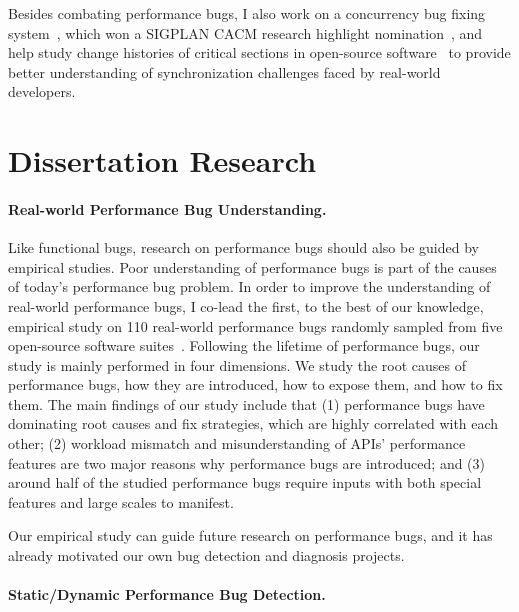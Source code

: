 \documentclass[10pt]{article}
\begin{document}
Besides combating performance bugs, 
I also work on a concurrency bug fixing system~\cite{jin11afix}, 
which won a SIGPLAN CACM research highlight nomination~\cite{afixnom}, 
and help study change histories of critical sections in open-source software~\cite{Gu15FSE} 
to provide better understanding of synchronization challenges faced by real-world developers.



\section{Dissertation Research}

\paragraph{Real-world Performance Bug Understanding.}
Like functional bugs, research on performance bugs should also be guided by empirical studies. 
Poor understanding of performance bugs is part of the causes of today's performance bug problem. 
In order to improve the understanding of real-world performance bugs, 
I co-lead the first, to the best of our knowledge, 
empirical study on 110 real-world performance bugs randomly sampled from five open-source software suites~\cite{jin12perfbug}. 
Following the lifetime of performance bugs, 
our study is mainly performed in four dimensions. 
We study the root causes of performance bugs, 
how they are introduced, how to expose them, and how to fix them. 
The main findings of our study include that 
(1) performance bugs have dominating root causes and fix strategies, which are highly correlated with each other; 
(2) workload mismatch and misunderstanding of APIs' performance features are two major reasons why performance bugs are introduced; 
and (3) around half of the studied performance bugs require inputs with both special features and large scales to manifest. 

Our empirical study can guide future research on performance bugs, 
and it has already motivated our own bug detection and diagnosis projects.


\paragraph{Static/Dynamic Performance Bug Detection.}
\end{document}
